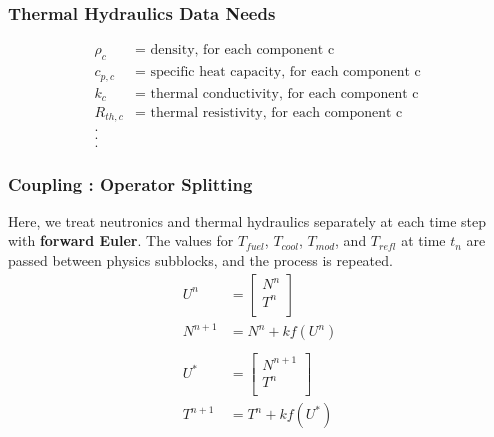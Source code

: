 \begin{frame}[fragile]
  \frametitle{Thermal Hydraulics Data Needs}
\footnotesize{
  \begin{align} 
    \rho_{c} &= \mbox{ density, for each component c }\\
    c_{p,c} &= \mbox{ specific heat capacity, for each component c }\\
    k_{c} &= \mbox{ thermal conductivity, for each component c }\\
    R_{th,c} &= \mbox{ thermal resistivity, for each component c }\\
    . &\\\nonumber
    . &\\\nonumber
    . &\nonumber
  \end{align}
}
\end{frame}



\begin{frame}[fragile]
  \frametitle{Coupling : Operator Splitting}
  Here, we treat neutronics and thermal hydraulics separately at 
  each time step with \textbf{forward Euler}. The values for $T_{fuel}$, 
  $T_{cool}$, $T_{mod}$, and $T_{refl}$ at time $t_n$ 
  are passed between physics subblocks, and the process is repeated.
  \footnotesize{
  \begin{align} 
    U^n &= \left[
                  \begin{array}{ c }
                    N^n\\
                    T^n\\
                  \end{array}
                  \right]\\
    N^{n+1} &= N^n + kf(U^n)\\
    \nonumber\\
    U^* &= \left[
                  \begin{array}{ c }
                    N^{n+1}\\
                    T^n\\
                  \end{array}
                  \right]\\
    T^{n+1} &= T^n + kf(U^*)
  \end{align}
  }
\end{frame}
